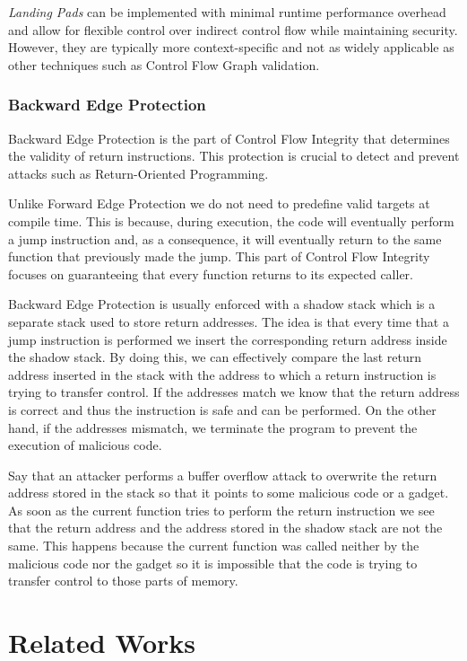 \textit{Landing Pads} can be implemented with minimal runtime performance
overhead and allow for flexible control over indirect control flow while
maintaining security. However, they are typically more context-specific and not
as widely applicable as other techniques such as Control Flow Graph validation.

\subsubsection{Backward Edge Protection}
\label{subsubsec:background_backward}

Backward Edge Protection is the part of Control Flow Integrity that determines the
validity of return instructions. This protection is crucial to detect and
prevent attacks such as Return-Oriented Programming.

Unlike Forward Edge Protection we do not need to predefine valid targets at
compile time. This is because, during execution, the code will eventually perform
a jump instruction and, as a consequence, it will eventually return to the same function
that previously made the jump. This part of Control Flow Integrity focuses on
guaranteeing that every function returns to its expected caller.

Backward Edge Protection is usually enforced with a shadow stack which is a
separate stack used to store return addresses. The idea is that every time that a
jump instruction is performed we insert the corresponding return address inside the
shadow stack. By doing this, we can effectively compare the last return address inserted
in the stack with the address to which a return instruction is trying to transfer
control. If the addresses match we know that the return address is correct and
thus the instruction is safe and can be performed. On the other hand, if the
addresses mismatch, we terminate the program to prevent the execution of malicious
code.

Say that an attacker performs a buffer overflow attack to overwrite the return address
stored in the stack so that it points to some malicious code or a gadget. As
soon as the current function tries to perform the return instruction we see that
the return address and the address stored in the shadow stack are not the same. This
happens because the current function was called neither by the malicious code nor
the gadget so it is impossible that the code is trying to transfer control to those
parts of memory.

\section{Related Works}
\label{sec:background_related}

